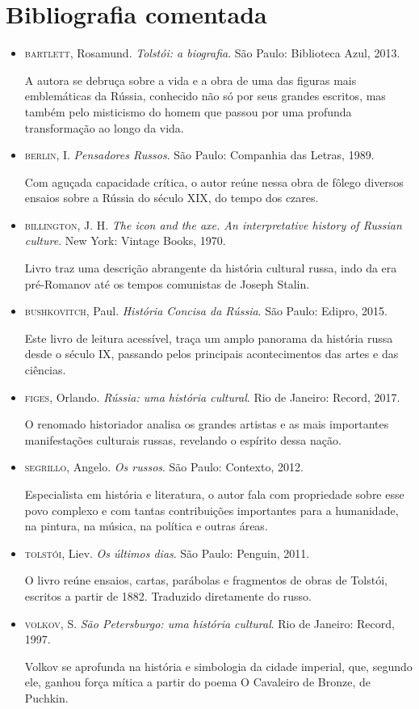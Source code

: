 \documentclass{extarticle}
\begin{document}
\section{Bibliografia comentada}

\begin{itemize}
\item\textsc{bartlett}, Rosamund. \textit{Tolstói: a biografia}. São Paulo: Biblioteca Azul, 2013.

A autora se debruça sobre a vida e a obra de uma das figuras mais
emblemáticas da Rússia, conhecido não só por seus grandes escritos, mas
também pelo misticismo do homem que passou por uma profunda
transformação ao longo da vida.

\item\textsc{berlin}, I. \textit{Pensadores Russos}. São Paulo: Companhia das Letras, 1989.

Com aguçada capacidade crítica, o autor reúne nessa obra de fôlego
diversos ensaios sobre a Rússia do século XIX, do tempo dos czares.

\item\textsc{billington}, J. H. \textit{The icon and the axe. An interpretative
history of Russian culture}. New York: Vintage Books, 1970.

Livro traz uma descrição abrangente da história cultural russa, indo da
era pré-Romanov até os tempos comunistas de Joseph Stalin.

\item\textsc{bushkovitch}, Paul. \textit{História Concisa da Rússia}. São Paulo:
Edipro, 2015.

Este livro de leitura acessível, traça um amplo panorama da história
russa desde o século IX, passando pelos principais acontecimentos das
artes e das ciências.

\item\textsc{figes}, Orlando. \textit{Rússia: uma história cultural}. Rio de Janeiro: Record, 2017.

O renomado historiador analisa os grandes artistas e as mais importantes
manifestações culturais russas, revelando o espírito dessa nação.

\item\textsc{segrillo}, Angelo. \textit{Os russos}. São Paulo: Contexto, 2012.

Especialista em história e literatura, o autor fala com propriedade
sobre esse povo complexo e com tantas contribuições importantes para a
humanidade, na pintura, na música, na política e outras áreas.

\item\textsc{tolstói}, Liev. \textit{Os últimos dias}. São Paulo: Penguin, 2011.

O livro reúne ensaios, cartas, parábolas e fragmentos de obras de
Tolstói, escritos a partir de 1882. Traduzido diretamente do russo.

\item\textsc{volkov}, S. \textit{São Petersburgo: uma história cultural}. Rio de
Janeiro: Record, 1997.

Volkov se aprofunda na história e simbologia da cidade imperial, que,
segundo ele, ganhou força mítica a partir do poema O Cavaleiro de
Bronze, de Puchkin.
\end{itemize}
\end{document}
